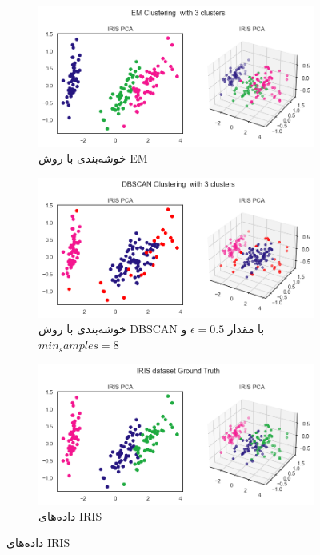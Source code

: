 \documentclass[a4paper, 12pt]{article}
\begin{document}
\begin{figure}[H]
	\begin{subfigure}[t]{.4\textwidth}
		\centering
		\includegraphics[width=\linewidth]{fig7.png}
		\caption{
			خوشه‌بندی با روش EM	
		}
	\end{subfigure}
	\hfill
	\begin{subfigure}[t]{.4\textwidth}
		\centering
		\includegraphics[width=\linewidth]{fig8.png}
		\caption{
			خوشه‌بندی با روش DBSCAN  با مقدار 
			$\epsilon = 0.5$
			و
			$min_samples = 8$	
		}
	\end{subfigure}
	
	\medskip
	
	\begin{subfigure}[t]{\textwidth}
		\centering
		\includegraphics[width=\linewidth]{fig5.png}
		\caption{
			داده‌های 
			IRIS	
		}
	\end{subfigure}

	\hfill
	
\end{figure}	
	
	
	
	
	
	
	
	\setLTRbibitems
	\makeatletter
	\makeatother
	 
	 	
\end{document}
